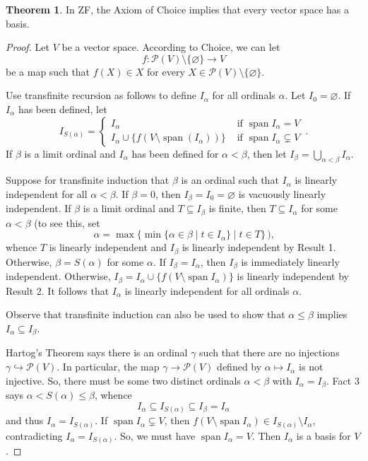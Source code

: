 \documentclass[12pt]{article}
\DeclareMathOperator{\spn}{span}
\let\emptyset\varnothing
\theoremstyle{definition}
\newtheorem*{theorem}{\color{blue} Theorem}
\begin{document}
\begin{theorem}
	In ZF, the Axiom of Choice implies that every vector space has a basis.
\end{theorem}
\begin{proof}
Let $V$ be a vector space. According to Choice, we can let
\[
	f: \mathcal{P}(V)\setminus\{\emptyset\}\rightarrow V
\]
be a map such that $f(X)\in X$ for every $X\in\mathcal{P}(V)\setminus\{\emptyset\}$.

Use transfinite recursion as follows to define $I_\alpha$ for all ordinals $\alpha$. Let $I_0 = \emptyset$. If $I_\alpha$ has been defined, let
\[
	I_{S(\alpha)} = \left\{ \begin{array}{ll}
		I_\alpha &\text{ if } \spn I_\alpha = V \\
		I_\alpha\cup\{f(V\setminus\spn(I_\alpha))\} &\text{ if } \spn I_\alpha \subsetneq V
	\end{array}\right.\,.
\]
If $\beta$ is a limit ordinal and $I_\alpha$ has been defined for $\alpha<\beta$, then let $I_\beta = \bigcup_{\alpha<\beta} I_\alpha$.

Suppose for transfinite induction that $\beta$ is an ordinal such that $I_\alpha$ is linearly independent for all $\alpha<\beta$. If $\beta = 0$, then $I_\beta=I_0=\emptyset$ is vacuously linearly independent. If $\beta$ is a limit ordinal and $T\subseteq I_\beta$ is finite, then $T\subseteq I_\alpha$ for some $\alpha<\beta$ (to see this, set
\[
	\alpha = \max\{\min\{\alpha\in\beta\mid t\in I_\alpha\} \mid t\in T\}\,\text{),}
\]
whence $T$ is linearly independent and $I_\beta$ is linearly independent by Result 1. Otherwise, $\beta = S(\alpha)$ for some $\alpha$. If $I_\beta = I_\alpha$, then $I_\beta$ is immediately linearly independent. Otherwise, $I_\beta = I_\alpha\cup\{f(V\setminus\spn I_\alpha)\}$ is linearly independent by Result 2. It follows that $I_\alpha$ is linearly independent for all ordinals $\alpha$.

Observe that transfinite induction can also be used to show that $\alpha\leq\beta$ implies $I_\alpha\subseteq I_\beta$.

Hartog's Theorem says there is an ordinal $\gamma$ such that there are no injections $\gamma\hookrightarrow\mathcal{P}(V)$. In particular, the map $\gamma\rightarrow\mathcal{P}(V)$ defined by $\alpha\mapsto I_\alpha$ is not injective. So, there must be some two distinct ordinals $\alpha<\beta$ with $I_\alpha = I_\beta$. Fact 3 says $\alpha<S(\alpha)\leq\beta$, whence
\[
	I_\alpha\subseteq I_{S(\alpha)}\subseteq I_\beta = I_\alpha
\]
and thus $I_\alpha = I_{S(\alpha)}$. If $\spn I_\alpha\subsetneq V$, then $f(V\setminus\spn I_\alpha)\in I_{S(\alpha)}\setminus I_\alpha$, contradicting $I_\alpha = I_{S(\alpha)}$. So, we must have $\spn I_\alpha = V$. Then $I_\alpha$ is a basis for $V$.
\end{proof}
\end{document}
